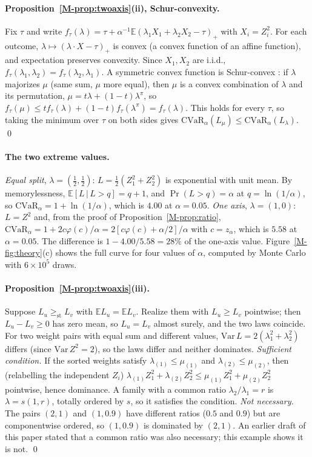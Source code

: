 \documentclass[aps,pra,onecolumn,notitlepage,superscriptaddress,nofootinbib,floatfix]{revtex4-2}
\newcommand{\cvar}{\mathrm{CVaR}}
\newcommand{\E}{\mathbb{E}}
\begin{document}
\paragraph*{Proposition~\ref{M-prop:twoaxis}(ii), Schur-convexity.} Fix $\tau$
and write $f_\tau(\lambda)=\tau+\alpha^{-1}\E(\lambda_1X_1+\lambda_2X_2-\tau)_+$
with $X_i=Z_i^2$. For each outcome, $\lambda\mapsto(\lambda\cdot X-\tau)_+$ is
convex (a convex function of an affine function), and expectation preserves
convexity. Since $X_1,X_2$ are i.i.d., $f_\tau(\lambda_1,\lambda_2)=f_\tau(\lambda_2,\lambda_1)$.
A symmetric convex function is Schur-convex \cite[Ch.~3]{Marshall2011}: if
$\lambda$ majorizes $\mu$ (same sum, $\mu$ more equal), then $\mu$ is a convex
combination of $\lambda$ and its permutation, $\mu=t\lambda+(1-t)\lambda^\pi$,
so $f_\tau(\mu)\le tf_\tau(\lambda)+(1-t)f_\tau(\lambda^\pi)=f_\tau(\lambda)$.
This holds for every $\tau$, so taking the minimum over $\tau$ on both sides
gives $\cvar_\alpha(L_\mu)\le\cvar_\alpha(L_\lambda)$. \qed

\paragraph*{The two extreme values.} \emph{Equal split}, $\lambda=(\tfrac12,\tfrac12)$:
$L=\tfrac12(Z_1^2+Z_2^2)$ is exponential with unit mean. By memorylessness,
$\E[L\,|\,L>q]=q+1$, and $\Pr(L>q)=\alpha$ at $q=\ln(1/\alpha)$, so
$\cvar_\alpha=1+\ln(1/\alpha)$, which is $4.00$ at $\alpha=0.05$.
\emph{One axis}, $\lambda=(1,0)$: $L=Z^2$ and, from the proof of
Proposition~\ref{M-prop:ratio},
$\cvar_\alpha=1+2c\varphi(c)/\alpha=2[c\varphi(c)+\alpha/2]/\alpha$ with
$c=z_\alpha$, which is $5.58$ at $\alpha=0.05$. The difference is
$1-4.00/5.58=28\%$ of the one-axis value.
Figure~\ref{M-fig:theory}(c) shows the full curve for four values of $\alpha$,
computed by Monte Carlo with $6\times10^5$ draws.

\paragraph*{Proposition~\ref{M-prop:twoaxis}(iii).} Suppose
$L_u\ge_{\mathrm{st}}L_v$ with $\E L_u=\E L_v$. Realize them with
$L_u\ge L_v$ pointwise; then $L_u-L_v\ge0$ has zero mean, so $L_u=L_v$ almost
surely, and the two laws coincide. For two weight pairs with equal sum and
different values, $\mathrm{Var}\,L=2(\lambda_1^2+\lambda_2^2)$ differs (since
$\mathrm{Var}\,Z^2=2$), so the laws differ and neither dominates.
\emph{Sufficient condition.} If the sorted weights satisfy
$\lambda_{(1)}\le\mu_{(1)}$ and $\lambda_{(2)}\le\mu_{(2)}$, then (relabelling
the independent $Z_i$) $\lambda_{(1)}Z_1^2+\lambda_{(2)}Z_2^2\le\mu_{(1)}Z_1^2+\mu_{(2)}Z_2^2$
pointwise, hence dominance. A family with a common ratio
$\lambda_2/\lambda_1=r$ is $\lambda=s(1,r)$, totally ordered by $s$, so it
satisfies the condition. \emph{Not necessary.} The pairs $(2,1)$ and
$(1,0.9)$ have different ratios ($0.5$ and $0.9$) but are componentwise
ordered, so $(1,0.9)$ is dominated by $(2,1)$. An earlier draft of this paper
stated that a common ratio was also necessary; this example shows it is not.
\qed
\end{document}
